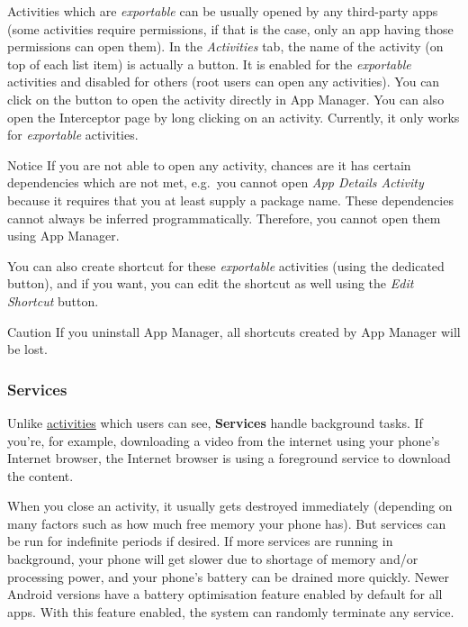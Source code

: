 Activities which are \textit{exportable} can be usually opened by any third-party apps (some activities require
permissions, if that is the case, only an app having those permissions can open them). In the \textit{Activities} tab,
the name of the activity (on top of each list item) is actually a button. It is enabled for the \textit{exportable}
activities and disabled for others (root users can open any activities). You can click on the button to open the
activity directly in App Manager. You can also open the Interceptor page by long clicking on an activity. Currently, it
only works for \textit{exportable} activities.

\begin{warning}{Notice}
    If you are not able to open any activity, chances are it has certain dependencies which are not met, e.g.\ you
    cannot open  \textit{App Details Activity} because it requires that you at least supply a package name. These
    dependencies cannot always be inferred programmatically. Therefore, you cannot open them using App Manager.
\end{warning}

You can also create shortcut for these \textit{exportable} activities (using the dedicated button), and if you want, you
can edit the shortcut as well using the \textit{Edit Shortcut} button.

\begin{danger}{Caution}
    If you uninstall App Manager, all shortcuts created by App Manager will be lost.
\end{danger}

\subsubsection{Services}\label{subsubsec:details:servcies}
Unlike \hyperref[subsubsec:activities]{activities} which users can see, \textbf{Services} handle background tasks. If
you're, for example, downloading a video from the internet using your phone's Internet browser, the Internet browser is
using a foreground service to download the content.

When you close an activity, it usually gets destroyed immediately (depending on many factors such as how much free
memory your phone has). But services can be run for indefinite periods if desired. If more services are running in
background, your phone will get slower due to shortage of memory and/or processing power, and your phone's battery can
be drained more quickly. Newer Android versions have a battery optimisation feature enabled by default for all apps.
With this feature enabled, the system can randomly terminate any service.

